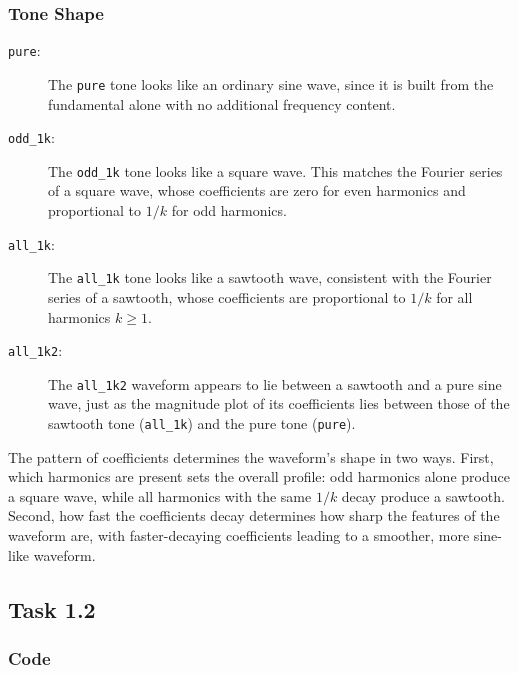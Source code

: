 \documentclass[11pt, a4paper]{article}
\begin{document}
\subsubsection*{Tone Shape}
\begin{description}
  \item[\texttt{pure}:] The \texttt{pure} tone looks like an ordinary sine wave, since it is built from the fundamental alone with no additional frequency content.
  \item[\texttt{odd\_1k}:] The \texttt{odd\_1k} tone looks like a square wave. This matches the Fourier series of a square wave, whose coefficients are zero for even harmonics and proportional to $1/k$ for odd harmonics.
  \item[\texttt{all\_1k}:] The \texttt{all\_1k} tone looks like a sawtooth wave, consistent with the Fourier series of a sawtooth, whose coefficients are proportional to $1/k$ for all harmonics $k \geq 1$.
  \item[\texttt{all\_1k2}:] The \texttt{all\_1k2} waveform appears to lie between a sawtooth and a pure sine wave, just as the magnitude plot of its coefficients lies between those of the sawtooth tone (\texttt{all\_1k}) and the pure tone (\texttt{pure}).
\end{description}

The pattern of coefficients determines the waveform's shape in two ways. First, which harmonics are present sets the overall profile: odd harmonics alone produce a square wave, while all harmonics with the same $1/k$ decay produce a sawtooth. Second, how fast the coefficients decay determines how sharp the features of the waveform are, with faster-decaying coefficients leading to a smoother, more sine-like waveform. 

\subsection*{Task 1.2}

\subsubsection*{Code}
\end{document}
